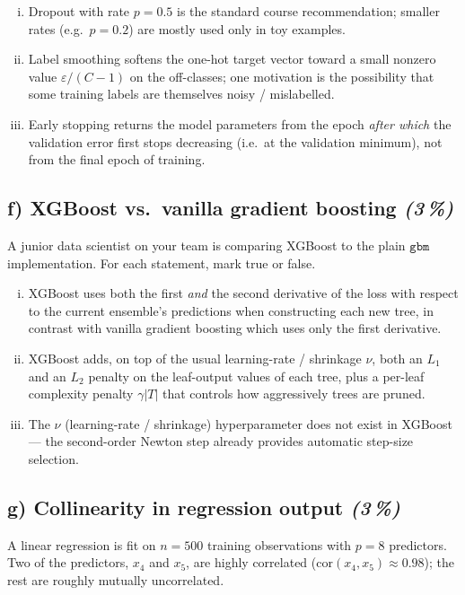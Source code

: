 \documentclass[11pt,a4paper]{article}
\newcommand{\subpoints}[1]{\textit{(#1\,\%)}}
\begin{document}
\begin{enumerate}[(i)]
  \item Dropout with rate $p = 0.5$ is the standard course recommendation; smaller rates (e.g.\ $p = 0.2$) are mostly used only in toy examples.
  \item Label smoothing softens the one-hot target vector toward a small nonzero value $\varepsilon/(C-1)$ on the off-classes; one motivation is the possibility that some training labels are themselves noisy / mislabelled.
  \item Early stopping returns the model parameters from the epoch \emph{after which} the validation error first stops decreasing (i.e.\ at the validation minimum), not from the final epoch of training.
\end{enumerate}

\subsection*{f) XGBoost vs.\ vanilla gradient boosting \subpoints{3}}

A junior data scientist on your team is comparing XGBoost to the plain $\mathtt{gbm}$ implementation. For each statement, mark true or false.

\begin{enumerate}[(i)]
  \item XGBoost uses both the first \emph{and} the second derivative of the loss with respect to the current ensemble's predictions when constructing each new tree, in contrast with vanilla gradient boosting which uses only the first derivative.
  \item XGBoost adds, on top of the usual learning-rate / shrinkage $\nu$, both an $L_1$ and an $L_2$ penalty on the leaf-output values of each tree, plus a per-leaf complexity penalty $\gamma|T|$ that controls how aggressively trees are pruned.
  \item The $\nu$ (learning-rate / shrinkage) hyperparameter does not exist in XGBoost --- the second-order Newton step already provides automatic step-size selection.
\end{enumerate}

\subsection*{g) Collinearity in regression output \subpoints{3}}

A linear regression is fit on $n = 500$ training observations with $p = 8$ predictors. Two of the predictors, $x_4$ and $x_5$, are highly correlated ($\mathrm{cor}(x_4, x_5) \approx 0.98$); the rest are roughly mutually uncorrelated.
\end{document}
